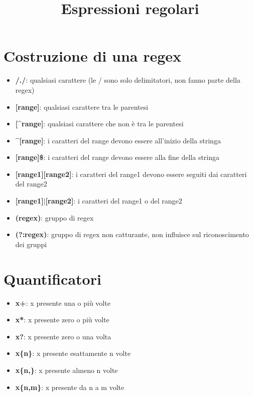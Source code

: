 \documentclass[12pt]{article}
\title{Espressioni regolari}
\author{}
\date{}
\begin{document}
\maketitle
\section{Costruzione di una regex}
\begin{itemize}
    \item \textbf{/./}: qualsiasi carattere (le / sono solo delimitatori, non fanno parte della regex)
    \item \textbf{[range]}: qualsiasi carattere tra le parentesi
    \item \textbf{[\textasciicircum range]}: qualsiasi carattere che non è tra le parentesi
    \item \textbf{\textasciicircum[range]}: i caratteri del range devono essere all'inizio della stringa
    \item \textbf{[range]\$}: i caratteri del range devono essere alla fine della stringa
    \item \textbf{[range1][range2]}: i caratteri del range1 devono essere seguiti dai caratteri del range2
    \item \textbf{[range1]$|$[range2]}: i caratteri del range1 o del range2
    \item \textbf{(regex)}: gruppo di regex
    \item \textbf{(?:regex)}: gruppo di regex non catturante, non influisce sul riconoscimento dei gruppi
\end{itemize}
\section{Quantificatori}
\begin{itemize}
    \item \textbf{x+}: x presente una o più volte
    \item \textbf{x*}: x presente zero o più volte
    \item \textbf{x?}: x presente zero o una volta
    \item \textbf{x\{n\}}: x presente esattamente n volte
    \item \textbf{x\{n,\}}: x presente almeno n volte
    \item \textbf{x\{n,m\}}: x presente da n a m volte
\end{itemize}
\end{document}
